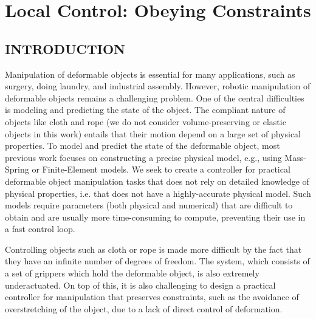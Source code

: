 \chapter{Local Control: Obeying Constraints}

\graphicspath{{control_constraints/images/}}

\section{INTRODUCTION}
Manipulation of deformable objects is essential for many applications, such as surgery, doing laundry, and industrial assembly. 
However, robotic manipulation of deformable objects remains a challenging problem. One of the central difficulties is modeling and predicting the state of the object.
The compliant nature of objects like cloth and rope (we do not consider volume-preserving or elastic objects in this work) entails that their motion depend on a large set of physical properties. To model and predict the state of the deformable object, most previous work focuses on constructing a precise physical model, e.g., using Mass-Spring \cite{Essahbi2012} or Finite-Element \cite{Muller2002} models. 
We seek to create a controller for practical deformable object manipulation tasks that does not rely on detailed knowledge of physical properties, i.e. that does not have a highly-accurate physical model. 
Such models require parameters (both physical and numerical) that are difficult to obtain and are usually more time-consuming to compute, preventing their use in a fast control loop. 





Controlling objects such as cloth or rope is made more difficult by the fact that they have an infinite number of degrees of freedom. The system, which consists of a set of grippers which hold the deformable object, is also extremely underactuated. %
On top of this, it is also challenging to design a practical controller for manipulation that preserves constraints, such as the avoidance of overstretching of the object, due to a lack of direct control of deformation.  

